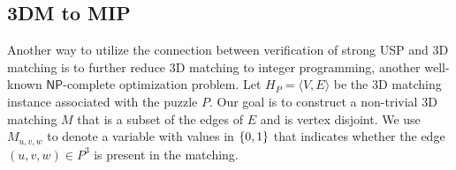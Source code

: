 \documentclass[11pt]{article}
\renewcommand\NP{\ensuremath{\mathsf{NP}}}
\begin{document}
    
    



 
\subsection{3DM to MIP}

Another way to utilize the connection between verification of strong
USP and 3D matching is to further reduce 3D matching to integer
programming, another well-known \NP{}-complete optimization problem.
Let $H_P = \langle V, E \rangle$ be the 3D matching instance
associated with the puzzle $P$.  Our goal is to construct a
non-trivial 3D matching $M$ that is a subset of the edges of $E$ and
is vertex disjoint.  We use $M_{u,v,w}$ to denote a variable with
values in $\left\{ 0,1 \right\}$ that indicates whether the edge $(u,v,w) \in P^3$
is present in the matching.
\end{document}
